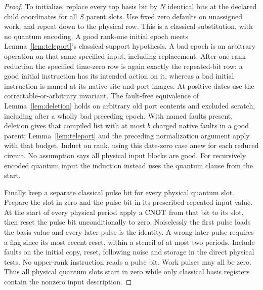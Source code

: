 \begin{proof}
To initialize, replace every top basis bit by $N$ identical bits at the declared child coordinates for all $S$ parent slots. Use fixed zero defaults on unassigned work, and repeat down to the physical row. This is a classical substitution, with no quantum encoding. A good rank-one initial epoch meets Lemma~\ref{lem:teleport}'s classical-support hypothesis. A bad epoch is an arbitrary operation on that same specified input, including replacement. After one rank reduction the specified time-zero row is again exactly the repeated-bit row: a good initial instruction has its intended action on it, whereas a bad initial instruction is named at its native site and port images. At positive dates use the correctable-or-arbitrary invariant. The fault-free equivalence of Lemma~\ref{lem:deletion} holds on arbitrary old port contents and excluded scratch, including after a wholly bad preceding epoch. With named faults present, deletion gives that compiled list with at most $b$ charged native faults in a good parent; Lemma~\ref{lem:teleport} and the preceding normalization argument apply with that budget. Induct on rank, using this date-zero case anew for each reduced circuit. No assumption says all physical input blocks are good. For recursively encoded quantum input the induction instead uses the quantum clause from the start.

Finally keep a separate classical pulse bit for every physical quantum slot. Prepare the slot in zero and the pulse bit in its prescribed repeated input value. At the start of every physical period apply a $\operatorname{CNOT}$ from that bit to its slot, then reset the pulse bit unconditionally to zero. Noiselessly the first pulse loads the basis value and every later pulse is the identity. A wrong later pulse requires a flag since its most recent reset, within a stencil of at most two periods. Include faults on the initial copy, reset, following noise and storage in the direct physical tests. No upper-rank instruction reads a pulse bit. Work pulses may all be zero. Thus all physical quantum slots start in zero while only classical basis registers contain the nonzero input description.
\end{proof}

